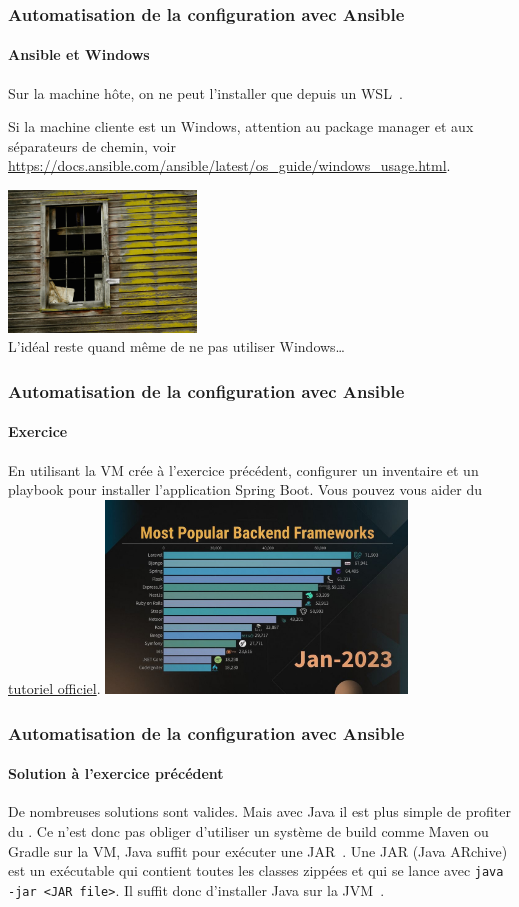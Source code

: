 \documentclass{beamer}
\begin{document}
    \begin{frame}
        \transdissolve
        \frametitle{Automatisation de la configuration avec Ansible}
        \framesubtitle{Ansible et Windows}
        Sur la machine hôte, on ne peut l'installer que depuis un WSL~.
        \begin{dangercolorbox}
            Si la machine cliente est un Windows, attention au package manager et aux séparateurs de chemin, voir \url{https://docs.ansible.com/ansible/latest/os_guide/windows_usage.html}.
        \end{dangercolorbox}
        \bigbreak
        \centering
        \includegraphics[width=5cm]{image/broken-windows} \\ L'idéal reste quand même de ne pas utiliser Windows\ldots \\
    \end{frame}

    \begin{frame}
        \transdissolve
        \frametitle{Automatisation de la configuration avec Ansible}
        \framesubtitle{Exercice \execcounterdispinc{}}
        En utilisant la VM crée à l'exercice précédent, configurer un inventaire et un playbook pour installer l'application Spring Boot.
        \bigbreak
        Vous pouvez vous aider du \href{https://spring.io/guides/gs/spring-boot}{tutoriel officiel}.
        \bigbreak
        \centering
        \includegraphics[width=8cm]{image/most-popular-backend}
    \end{frame}

    \begin{frame}
        \transdissolve
        \frametitle{Automatisation de la configuration avec Ansible}
        \framesubtitle{Solution à l'exercice précédent}
        De nombreuses solutions sont valides.
        Mais avec Java il est plus simple de profiter du .
        \bigbreak
        Ce n'est donc pas obliger d'utiliser un système de build comme Maven ou Gradle sur la VM, Java suffit pour exécuter une JAR~.
        \bigbreak
        Une JAR (Java ARchive) est un exécutable qui contient toutes les classes zippées et qui se lance avec \lstinline{java -jar <JAR file>}.
        Il suffit donc d'installer Java sur la JVM~.
    \end{frame}
\end{document}
